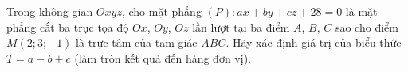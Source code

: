 \begin{ex}
Trong không gian $Oxyz$, cho mặt phẳng $(P)\colon ax+by+cz+28=0$ là mặt phẳng cắt ba trục tọa độ $Ox$, $Oy$, $Oz$ lần lượt tại ba điểm $A$, $B$, $C$ sao cho điểm $M(2;3;-1)$ là trực tâm của tam giác $ABC$. Hãy xác định giá trị của biểu thức $T=a-b+c$ (làm tròn kết quả đến hàng đơn vị).
\end{ex}
